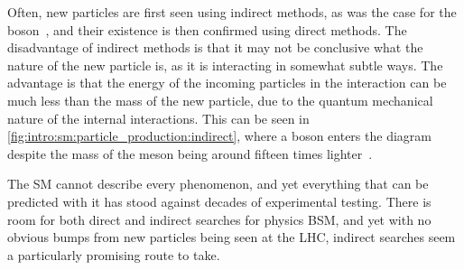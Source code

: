 Often, new particles are first seen using indirect methods, as was the case for 
the \PZ boson~\cite{HASERT1973138}, and their existence is then confirmed using 
direct methods.
The disadvantage of indirect methods is that it may not be conclusive what the 
nature of the new particle is, as it is interacting in somewhat subtle ways.
The advantage is that the energy of the incoming particles in the interaction 
can be much less than the mass of the new particle, due to the quantum 
mechanical nature of the internal interactions.
This can be seen in \cref{fig:intro:sm:particle_production:indirect}, where a 
\PW boson enters the diagram despite the mass of the \PBs meson being around 
fifteen times lighter~\cite{PDG2014}.

The \ac{SM} cannot describe every phenomenon, and yet everything that can be
predicted with it has stood against decades of experimental testing.
There is room for both direct and indirect searches for physics \acl{BSM}, and 
yet with no obvious bumps from new particles being seen at the \ac{LHC}, 
indirect searches seem a particularly promising route to take.
